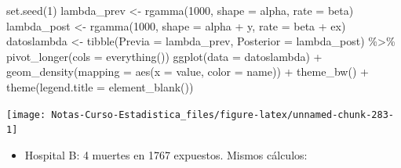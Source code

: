 \documentclass[
  12pt,
]{book}
\newenvironment{Shaded}{\begin{snugshade}}{\end{snugshade}}
\newcommand{\AttributeTok}[1]{\textcolor[rgb]{0.77,0.63,0.00}{#1}}
\newcommand{\DecValTok}[1]{\textcolor[rgb]{0.00,0.00,0.81}{#1}}
\newcommand{\FunctionTok}[1]{\textcolor[rgb]{0.00,0.00,0.00}{#1}}
\newcommand{\NormalTok}[1]{#1}
\newcommand{\OtherTok}[1]{\textcolor[rgb]{0.56,0.35,0.01}{#1}}
\newcommand{\SpecialCharTok}[1]{\textcolor[rgb]{0.00,0.00,0.00}{#1}}
\providecommand{\tightlist}{%
  \setlength{\itemsep}{0pt}\setlength{\parskip}{0pt}}
\begin{document}
\begin{Shaded}
\begin{Highlighting}[]
\FunctionTok{set.seed}\NormalTok{(}\DecValTok{1}\NormalTok{)}
\NormalTok{lambda\_prev }\OtherTok{\textless{}{-}} \FunctionTok{rgamma}\NormalTok{(}\DecValTok{1000}\NormalTok{, }\AttributeTok{shape =}\NormalTok{ alpha, }\AttributeTok{rate =}\NormalTok{ beta)}
\NormalTok{lambda\_post }\OtherTok{\textless{}{-}} \FunctionTok{rgamma}\NormalTok{(}\DecValTok{1000}\NormalTok{, }\AttributeTok{shape =}\NormalTok{ alpha }\SpecialCharTok{+}\NormalTok{ y, }\AttributeTok{rate =}\NormalTok{ beta }\SpecialCharTok{+}
\NormalTok{    ex)}
\NormalTok{datoslambda }\OtherTok{\textless{}{-}} \FunctionTok{tibble}\NormalTok{(}\AttributeTok{Previa =}\NormalTok{ lambda\_prev, }\AttributeTok{Posterior =}\NormalTok{ lambda\_post) }\SpecialCharTok{\%\textgreater{}\%}
    \FunctionTok{pivot\_longer}\NormalTok{(}\AttributeTok{cols =} \FunctionTok{everything}\NormalTok{())}
\FunctionTok{ggplot}\NormalTok{(}\AttributeTok{data =}\NormalTok{ datoslambda) }\SpecialCharTok{+} \FunctionTok{geom\_density}\NormalTok{(}\AttributeTok{mapping =} \FunctionTok{aes}\NormalTok{(}\AttributeTok{x =}\NormalTok{ value,}
    \AttributeTok{color =}\NormalTok{ name)) }\SpecialCharTok{+} \FunctionTok{theme\_bw}\NormalTok{() }\SpecialCharTok{+} \FunctionTok{theme}\NormalTok{(}\AttributeTok{legend.title =} \FunctionTok{element\_blank}\NormalTok{())}
\end{Highlighting}
\end{Shaded}

\begin{center}\texttt{[image: Notas-Curso-Estadistica\_files/figure-latex/unnamed-chunk-283-1]} \end{center}

\begin{itemize}
\tightlist
\item
  Hospital B: 4 muertes en 1767 expuestos. Mismos cálculos:
\end{itemize}
\end{document}
